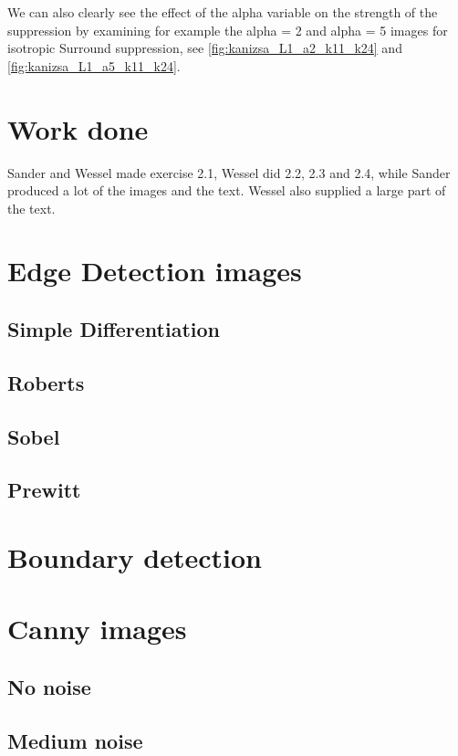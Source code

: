 \documentclass[10pt,a4paper]{article}
\begin{document}
We can also clearly see the effect of the alpha variable on the strength of the suppression by examining for example the alpha = 2 and alpha = 5 images for isotropic Surround suppression, see \ref{fig:kanizsa_L1_a2_k11_k24} and \ref{fig:kanizsa_L1_a5_k11_k24}.

\section{Work done}
Sander and Wessel made exercise 2.1, Wessel did 2.2, 2.3 and 2.4, while Sander produced a lot of the images and the text. Wessel also supplied a large part of the text.

\section{Edge Detection images}
\subsection{Simple Differentiation}



\subsection{Roberts}


\subsection{Sobel}


\subsection{Prewitt}



\section{Boundary detection}


\section{Canny images}
\subsection{No noise}

\subsection{Medium noise}

\end{document}
